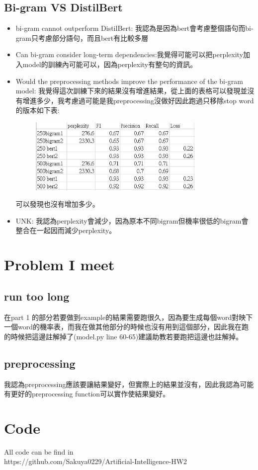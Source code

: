 \documentclass[12,a4paper]{article}
\begin{document}
\subsection{Bi-gram VS DistilBert}
\begin{itemize}
    \item bi-gram cannot outperform DistilBert: 我認為是因為bert會考慮整個語句而bi-gram只考慮部分語句，而且bert有比較多層
    \item Can bi-gram consider long-term dependencies:我覺得可能可以把perplexity加入model的訓練內可能可以，因為perplexity有整句的資訊。
    \item Would the preprocessing methods improve the performance of the bi-gram model: 我覺得這次訓練下來的結果沒有增進結果，從上面的表格可以發現並沒有增進多少，我考慮過可能是我preprocessing沒做好因此跑過只移除stop word的版本如下表:
    \begin{figure}[!ht]
    \centering
    \includegraphics[width=0.8\textwidth]{pic/sheet2.png}
    \end{figure}
    \FloatBarrier
    可以發現也沒有增加多少。
    \item UNK: 我認為perplexity會減少，因為原本不同bigram但機率很低的bigram會整合在一起因而減少perplexity。
\end{itemize}
\section{Problem I meet}
\subsection{run too long}
在part 1 的部分若要做到example的結果需要跑很久，因為要生成每個word對映下一個word的機率表，而我在做其他部分的時候也沒有用到這個部分，因此我在跑的時候把這邊註解掉了(model.py line 60-65)建議助教若要跑把這邊也註解掉。
\subsection{preprocessing}
我認為preprocessing應該要讓結果變好，但實際上的結果並沒有，因此我認為可能有更好的preprocessing function可以實作使結果變好。
\section{Code}
All code can be find in\\
https://github.com/Sakuya0229/Artificial-Intelligence-HW2
\end{document}
